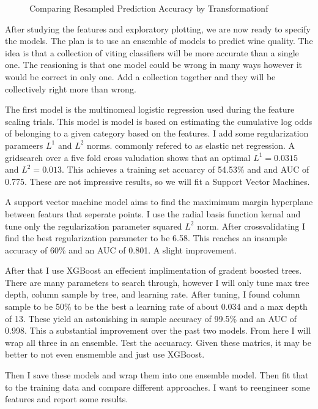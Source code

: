 \documentclass[16pt,twocolumn,letterpaper,titlepage]{article}
\begin{document}
\begin{figure}[!htb]
	\caption{\label{fig:my-label} Comparing Resampled Prediction Accuracy by Transformationf}
\end{figure}
 
After studying the features and exploratory plotting, we are now ready to specify the models. The plan is to use an ensemble of models to predict wine quality. The idea is that a collection of viting classifiers will be more accurate than a single one. The reasioning is that one model could be wrong in many ways however it would be correct in only one. Add a collection together and they will be collectively right more than wrong.


The first model is the multinomeal logistic regression used during the feature scaling trials. This model is model is based on estimating the cumulative log odds of belonging to a given category based on the features. I add some regularization parameers $L^1$ and $L^2$ norms. commonly refered to as elastic net regression. A gridsearch over a five fold cross valudation shows that an optimal $L^1 = 0.0315$ and $L^2 = 0.013$. This achieves a training set accuarcy of 54.53\% and and AUC of 0.775. These are not impressive results, so we will fit a Support Vector Machines. 

A support vector machine model aims to find the maximimum margin hyperplane between featurs that seperate points. I use the radial basis function kernal and tune only the regularization parameter squared $L^2$ norm. After crossvalidating I find the best regularization parameter to be 6.58. This reaches an insample accuracy of 60\% and an AUC of 0.801. A slight improvement. 

After that I use XGBoost \cite{Chen2016} an effecient implimentation of gradent boosted trees. There are many parameters to search through, however I will only tune max tree depth, column sample by tree, and learning rate. After tuning, I found column sample to be 50\% to be the best a learning rate of about 0.034 and a max depth of 13. These yield an astonishing in sample accuracy of 99.5\% and an AUC of 0.998. This a substantial improvement over the past two models. From here I will wrap all three in an ensemble. Test the accuaracy. Given these matrics, it may be  better to not even ensmemble and just use XGBoost. 

Then I save these models and wrap them into one ensemble model. Then fit that to the training data and compare different approaches. I want to reengineer some features and report some results. 
\end{document}
